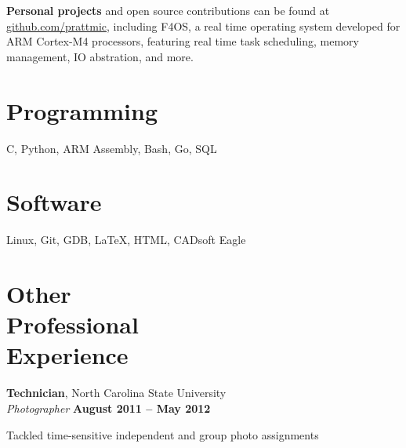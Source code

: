 \documentclass[margin,line,letterpaper]{resume}
\begin{document}
\begin{resume}
    \textbf{Personal projects} and open source contributions can be found at \href{http://github.com/prattmic}{github.com/prattmic},
    including F4OS, a real time operating system developed for ARM Cortex-M4 processors, featuring real time task scheduling,
    memory management, IO abstration, and more.


    \section{\mysidestyle Programming} 
    C, Python, ARM Assembly, Bash, Go, SQL
    \vspace{-5mm}

    \section{\mysidestyle Software} 
    Linux, Git, GDB, \LaTeX, HTML, CADsoft Eagle



    \section{\mysidestyle Other\\Professional\\Experience}

    \textbf{Technician}, North Carolina State University \vspace{2mm}\\\vspace{1mm}%
    \textsl{Photographer} \hfill \textbf{August 2011 -- May 2012}\vspace{-3mm}\\\vspace{-1mm}%
    \begin{list2}
    \item Tackled time-sensitive independent and group photo assignments
    \end{list2}\vspace{-1.5mm}


\end{resume}
\end{document}

